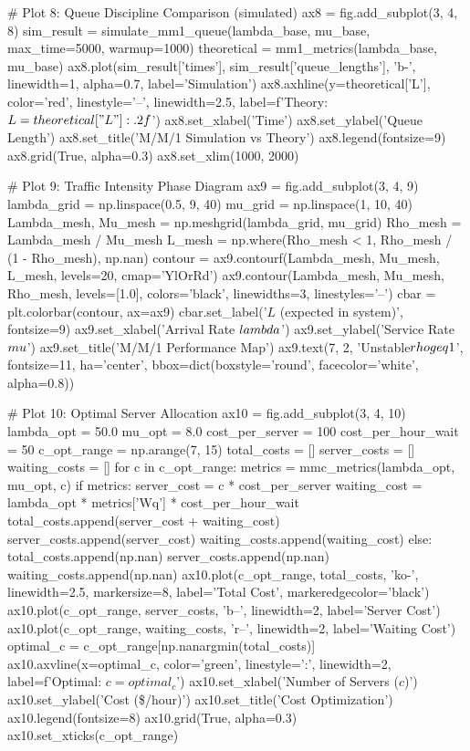 \documentclass[a4paper, 11pt]{article}
\begin{document}
\begin{pycode}
# Plot 8: Queue Discipline Comparison (simulated)
ax8 = fig.add_subplot(3, 4, 8)
sim_result = simulate_mm1_queue(lambda_base, mu_base, max_time=5000, warmup=1000)
theoretical = mm1_metrics(lambda_base, mu_base)
ax8.plot(sim_result['times'], sim_result['queue_lengths'], 'b-',
         linewidth=1, alpha=0.7, label='Simulation')
ax8.axhline(y=theoretical['L'], color='red', linestyle='--', linewidth=2.5,
            label=f'Theory: $L={theoretical["L"]:.2f}$')
ax8.set_xlabel('Time')
ax8.set_ylabel('Queue Length')
ax8.set_title('M/M/1 Simulation vs Theory')
ax8.legend(fontsize=9)
ax8.grid(True, alpha=0.3)
ax8.set_xlim(1000, 2000)

# Plot 9: Traffic Intensity Phase Diagram
ax9 = fig.add_subplot(3, 4, 9)
lambda_grid = np.linspace(0.5, 9, 40)
mu_grid = np.linspace(1, 10, 40)
Lambda_mesh, Mu_mesh = np.meshgrid(lambda_grid, mu_grid)
Rho_mesh = Lambda_mesh / Mu_mesh
L_mesh = np.where(Rho_mesh < 1, Rho_mesh / (1 - Rho_mesh), np.nan)
contour = ax9.contourf(Lambda_mesh, Mu_mesh, L_mesh, levels=20, cmap='YlOrRd')
ax9.contour(Lambda_mesh, Mu_mesh, Rho_mesh, levels=[1.0], colors='black',
            linewidths=3, linestyles='--')
cbar = plt.colorbar(contour, ax=ax9)
cbar.set_label('$L$ (expected in system)', fontsize=9)
ax9.set_xlabel('Arrival Rate $\\lambda$')
ax9.set_ylabel('Service Rate $\\mu$')
ax9.set_title('M/M/1 Performance Map')
ax9.text(7, 2, 'Unstable\n$\\rho \\geq 1$', fontsize=11, ha='center',
         bbox=dict(boxstyle='round', facecolor='white', alpha=0.8))

# Plot 10: Optimal Server Allocation
ax10 = fig.add_subplot(3, 4, 10)
lambda_opt = 50.0
mu_opt = 8.0
cost_per_server = 100
cost_per_hour_wait = 50
c_opt_range = np.arange(7, 15)
total_costs = []
server_costs = []
waiting_costs = []
for c in c_opt_range:
    metrics = mmc_metrics(lambda_opt, mu_opt, c)
    if metrics:
        server_cost = c * cost_per_server
        waiting_cost = lambda_opt * metrics['Wq'] * cost_per_hour_wait
        total_costs.append(server_cost + waiting_cost)
        server_costs.append(server_cost)
        waiting_costs.append(waiting_cost)
    else:
        total_costs.append(np.nan)
        server_costs.append(np.nan)
        waiting_costs.append(np.nan)
ax10.plot(c_opt_range, total_costs, 'ko-', linewidth=2.5, markersize=8,
          label='Total Cost', markeredgecolor='black')
ax10.plot(c_opt_range, server_costs, 'b--', linewidth=2, label='Server Cost')
ax10.plot(c_opt_range, waiting_costs, 'r--', linewidth=2, label='Waiting Cost')
optimal_c = c_opt_range[np.nanargmin(total_costs)]
ax10.axvline(x=optimal_c, color='green', linestyle=':', linewidth=2,
             label=f'Optimal: $c={optimal_c}$')
ax10.set_xlabel('Number of Servers ($c$)')
ax10.set_ylabel('Cost (\$/hour)')
ax10.set_title('Cost Optimization')
ax10.legend(fontsize=8)
ax10.grid(True, alpha=0.3)
ax10.set_xticks(c_opt_range)


\end{pycode}
\end{document}
